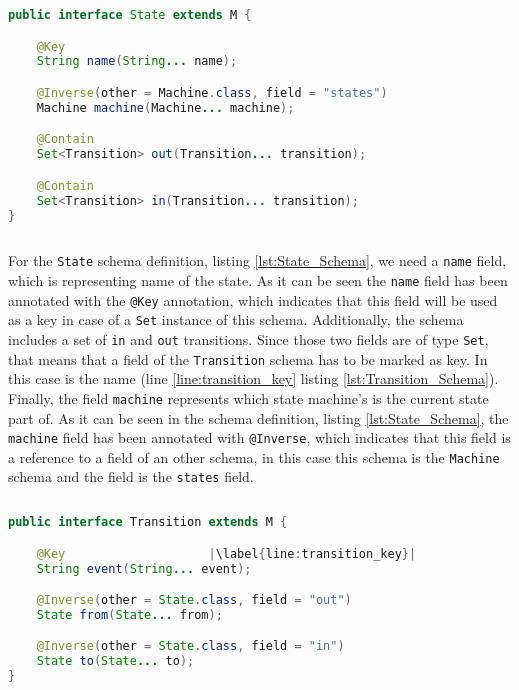 \begin{sourcecode}[H]
	\begin{lstlisting}[language=Java,escapechar=|]
public interface State extends M {

	@Key
    String name(String... name);

    @Inverse(other = Machine.class, field = "states")
    Machine machine(Machine... machine);

    @Contain
    Set<Transition> out(Transition... transition);

	@Contain
    Set<Transition> in(Transition... transition);
}
	\end{lstlisting}
	\caption{The State Schema}
	\label{lst:State_Schema}
\end{sourcecode}

For the \texttt{State} schema definition, listing \ref{lst:State_Schema}, we need a \texttt{name} field, which is representing name of the state. 
As it can be seen the \texttt{name} field has been annotated with the \texttt{@Key} annotation, which indicates that this field will be used as a key in case of a \texttt{Set} instance of this schema.
Additionally, the schema includes a set of \texttt{in} and \texttt{out} transitions.
Since those two fields are of type \texttt{Set}, that means that a field of the \texttt{Transition} schema has to be marked as key.
In this case is the name (line \ref{line:transition_key} listing \ref{lst:Transition_Schema}).
Finally, the field \texttt{machine} represents which state machine's is the current state part of. 
As it can be seen in the schema definition, listing \ref{lst:State_Schema}, the \texttt{machine} field has been annotated with \texttt{@Inverse}, which indicates that this field is a reference to a field of an other schema, in this case this schema is the \texttt{Machine} schema and the field is the \texttt{states} field.

\begin{sourcecode}[H]
	\begin{lstlisting}[language=Java,escapechar=|]
public interface Transition extends M {

    @Key 					|\label{line:transition_key}| 
    String event(String... event);

    @Inverse(other = State.class, field = "out")
    State from(State... from);

    @Inverse(other = State.class, field = "in")
    State to(State... to);
}
	\end{lstlisting}
	\caption{The Transition Schema}
	\label{lst:Transition_Schema}
\end{sourcecode}


